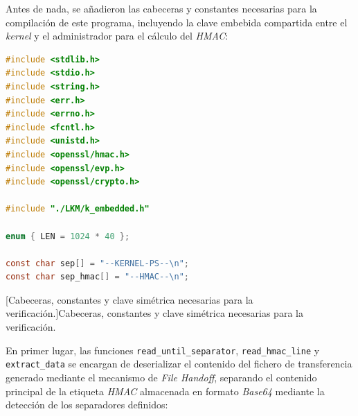 Antes de nada, se añadieron las cabeceras y constantes necesarias para la compilación de este programa, incluyendo la clave embebida compartida entre el \textit{kernel} y el administrador para el cálculo del \textit{HMAC}:

\begin{lstlisting}[language=C]
#include <stdlib.h>
#include <stdio.h>
#include <string.h>
#include <err.h>
#include <errno.h>
#include <fcntl.h>
#include <unistd.h>
#include <openssl/hmac.h>
#include <openssl/evp.h>
#include <openssl/crypto.h>

#include "./LKM/k_embedded.h"

enum { LEN = 1024 * 40 };

const char sep[] = "--KERNEL-PS--\n";
const char sep_hmac[] = "--HMAC--\n";
\end{lstlisting}
\captionsetup{type=code,justification=centering,singlelinecheck=false}
[Cabeceras, constantes y clave simétrica necesarias para la verificación.]{Cabeceras, constantes y clave simétrica necesarias para la verificación.}
\label{cod:check_hmac}
\vspace{\baselineskip}

En primer lugar, las funciones \verb|read_until_separator|, \verb|read_hmac_line| y \verb|extract_data| se encargan de deserializar el contenido del fichero de transferencia generado mediante el mecanismo de \textit{File Handoff}, separando el contenido principal de la etiqueta \textit{HMAC} almacenada en formato \textit{Base64} mediante la detección de los separadores definidos:

